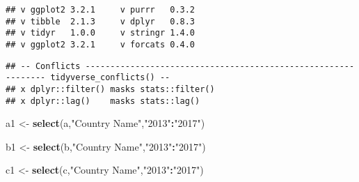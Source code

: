 \documentclass[ignorenonframetext,]{beamer}
\newenvironment{Shaded}{\begin{snugshade}}{\end{snugshade}}
\newcommand{\KeywordTok}[1]{\textcolor[rgb]{0.13,0.29,0.53}{\textbf{#1}}}
\newcommand{\NormalTok}[1]{#1}
\newcommand{\OperatorTok}[1]{\textcolor[rgb]{0.81,0.36,0.00}{\textbf{#1}}}
\newcommand{\StringTok}[1]{\textcolor[rgb]{0.31,0.60,0.02}{#1}}
\begin{document}
\begin{frame}[fragile]
\begin{verbatim}
## v ggplot2 3.2.1     v purrr   0.3.2
## v tibble  2.1.3     v dplyr   0.8.3
## v tidyr   1.0.0     v stringr 1.4.0
## v ggplot2 3.2.1     v forcats 0.4.0
\end{verbatim}

\begin{verbatim}
## -- Conflicts -------------------------------------------------------------- tidyverse_conflicts() --
## x dplyr::filter() masks stats::filter()
## x dplyr::lag()    masks stats::lag()
\end{verbatim}

\begin{Shaded}
\begin{Highlighting}[]
\NormalTok{a1 <-}\StringTok{ }\KeywordTok{select}\NormalTok{(a,}\StringTok{"Country Name"}\NormalTok{,}\StringTok{"2013"}\OperatorTok{:}\StringTok{"2017"}\NormalTok{)}
\end{Highlighting}
\end{Shaded}

\begin{Shaded}
\end{Shaded}

\begin{Shaded}
\begin{Highlighting}[]
\NormalTok{b1 <-}\StringTok{ }\KeywordTok{select}\NormalTok{(b,}\StringTok{"Country Name"}\NormalTok{,}\StringTok{"2013"}\OperatorTok{:}\StringTok{"2017"}\NormalTok{)}
\end{Highlighting}
\end{Shaded}

\begin{Shaded}
\end{Shaded}

\begin{Shaded}
\begin{Highlighting}[]
\NormalTok{c1 <-}\StringTok{ }\KeywordTok{select}\NormalTok{(c,}\StringTok{"Country Name"}\NormalTok{,}\StringTok{"2013"}\OperatorTok{:}\StringTok{"2017"}\NormalTok{)}
\end{Highlighting}
\end{Shaded}


\end{frame}
\end{document}
